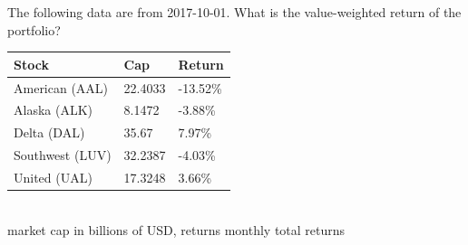 The following data are from 2017-10-01. What is the value-weighted return of the portfolio?
\begin{center}
	\begin{tabular}{l|ll}
		\textbf{Stock} & \textbf{Cap} & \textbf{Return} \\ \hline
		American (AAL) & 22.4033 & -13.52\% \\
		Alaska (ALK) & 8.1472 & -3.88\% \\
		Delta (DAL) & 35.67 & 7.97\% \\
		Southwest (LUV) & 32.2387 & -4.03\% \\
		United (UAL) & 17.3248 & 3.66\%\\\hline
	\end{tabular}\\
	{\footnotesize market cap in billions of USD, returns monthly total returns}
\end{center}
